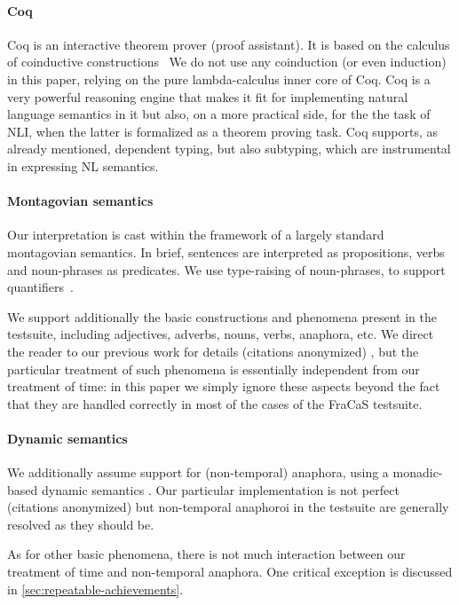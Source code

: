 \documentclass[a4paper,11pt]{article}
\begin{document}
\paragraph{Coq}
Coq is an interactive theorem prover (proof assistant). It is based on
the calculus of coinductive constructions~\citep{werner_une_1994} We
do not use any coinduction (or even induction) in this paper, relying
on the pure lambda-calculus inner core of Coq.  Coq is a very
powerful reasoning engine that makes it fit for implementing natural
language semantics in it but also, on a more practical side, for the
the task of NLI, when the latter is formalized as a theorem proving
task. Coq supports, as already mentioned, dependent typing, but also
subtyping, which are instrumental in expressing NL semantics.

\paragraph{Montagovian semantics}

Our interpretation is cast within the framework of a largely standard
montagovian semantics. In brief, sentences are interpreted as
propositions, verbs and noun-phrases as predicates.  We use
type-raising of noun-phrases, to support quantifiers~\citep{montague_proper_1974}.

We support additionally the basic constructions and phenomena present
in the testsuite, including adjectives, adverbs, nouns, verbs,
anaphora, etc. We direct the reader to our previous work for details
\ifanon (citations anonymized) \else
\citet{bernardy_type_2017} \fi, but the particular
treatment of such phenomena is essentially independent from our
treatment of time:
in this paper we simply ignore these aspects beyond the fact that they
are handled correctly in most of the cases of the FraCaS testsuite.

\paragraph{Dynamic semantics}
We additionally assume support for (non-temporal) anaphora, using a
monadic-based dynamic semantics
\cite{unger_dynamic_2011,charlow_monadic_2015,charlow_monadic_2017}.
Our particular implementation is not perfect \ifanon (citations
anonymized) \else \citet{bernardy_wide_2019} \fi but non-temporal
anaphoroi in the testsuite are generally resolved as they should be.

As for other basic phenomena, there is not much interaction between
our treatment of time and non-temporal anaphora. One critical
exception is discussed in \cref{sec:repeatable-achievements}.
\end{document}
